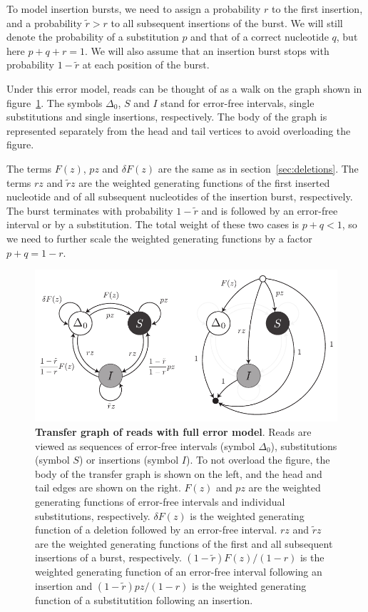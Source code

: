 \documentclass{article}
\begin{document}
To model insertion bursts, we need to assign a probability $r$ to the
first insertion, and a probability $\tilde{r} > r$ to all subsequent
insertions of the burst. We will still denote the probability of a
substitution $p$ and that of a correct nucleotide $q$, but here $p+q+r=1$.
We will also assume that an insertion burst stops with probability
$1-\tilde{r}$ at each position of the burst.

Under this error model, reads can be thought of as a walk on the graph
shown in figure~\ref{fig:insertions}. The symbols $\Delta_0$, $S$ and $I$
stand for error-free intervals, single substitutions and single
insertions, respectively. The body of the graph is represented separately
from the head and tail vertices to avoid overloading the figure.

The terms $F(z)$, $pz$ and $\delta F(z)$ are the same as in
section~\ref{sec:deletions}. The terms $rz$ and $\tilde{r}z$ are the
weighted generating functions of the first inserted nucleotide and of all
subsequent nucleotides of the insertion burst, respectively. The burst
terminates with probability $1-\tilde{r}$ and is followed by an error-free
interval or by a substitution. The total weight of these two cases is
$p+q<1$, so we need to further scale the weighted generating functions by
a factor $p+q=1-r$.


\begin{figure}[h]
\centering
\includegraphics[scale=0.9]{insertions.pdf}
\caption{\textbf{Transfer graph of reads with full error model}. Reads are
viewed as sequences of error-free intervals (symbol $\Delta_0$),
substitutions (symbol $S$) or insertions (symbol $I$). To not overload the
figure, the body of the transfer graph is shown on the left, and the head
and tail edges are shown on the right. $F(z)$ and $pz$ are the weighted
generating functions of error-free intervals and individual substitutions,
respectively. $\delta F(z)$ is the weighted generating function of a
deletion followed by an error-free interval. $rz$ and $\tilde{r}z$ are the
weighted generating functions of the first and all subsequent insertions
of a burst, respectively. $(1-\tilde{r})F(z)/(1-r)$ is the weighted
generating function of an error-free interval following an insertion and
$(1-\tilde{r})pz/(1-r)$ is the weighted generating function of a
substitutition following an insertion.}
\label{fig:insertions}
\end{figure}
\end{document}
